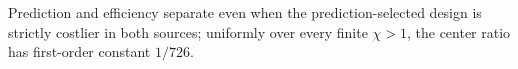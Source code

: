Prediction and efficiency separate even when the prediction-selected design is strictly costlier in both sources; uniformly over every finite \(\chi>1\), the center ratio has first-order constant \(1/726\).